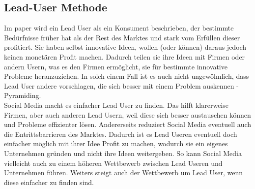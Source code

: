 \subsection{Lead-User Methode}
Im paper wird ein Lead User als ein Konsument beschrieben, der bestimmte Bed\"urfnisse fr\"uher hat als der Rest des Marktes und stark vom Erf\"ullen dieser profitiert. Sie haben selbst innovative Ideen, wollen (oder k\"onnen) daraus jedoch keinen monet\"aren Profit machen. Dadurch teilen sie ihre Ideen mit Firmen oder andern Usern, was es den Firmen erm\"oglicht, sie f\"ur bestimmte innovative Probleme heranzuziehen. In solch einem Fall ist es auch nicht ungew\"ohnlich, dass Lead User andere vorschlagen, die sich besser mit einem Problem auskennen - Pyramiding.\\
Social Media macht es einfacher Lead User zu finden. Das hilft klarerweise Firmen, aber auch anderen Lead Usern, weil diese sich besser austauschen k\"onnen und Probleme effizienter l\"osen. Andererseits reduziert Social Media eventuell auch die Entrittsbarrieren des Marktes. Dadurch ist es Lead Useren eventuell doch einfacher m\"oglich mit ihrer Idee Profit zu machen, wodurch sie ein eigenes Unternehmen gr\"unden und nicht ihre Ideen weitergeben. So kann Social Media vielleicht auch zu einem h\"oheren Wettbewerb zwischen Lead Useren und Unternehmen f\"uhren. Weiters steigt auch der Wettbewerb um Lead User, wenn diese einfacher zu finden sind.













